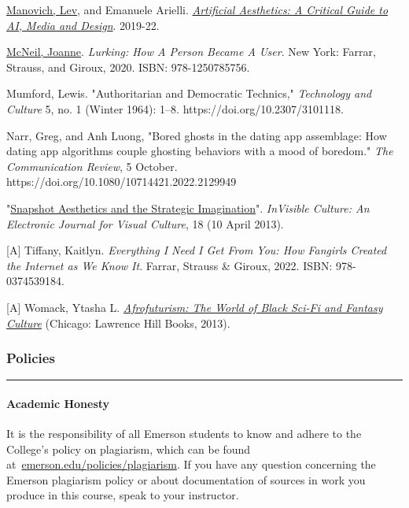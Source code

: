\documentclass[
  letterpaper,
  DIV=11,
  numbers=noendperiod]{scrartcl}
\let\oldparagraph\paragraph
\renewcommand{\paragraph}[1]{\oldparagraph{#1}\mbox{}}
\begin{document}
\href{https://manovich.net/}{Manovich, Lev}, and Emanuele Arielli.
\href{http://manovich.net/index.php/projects/artificial-aesthetics-book}{\emph{Artificial
Aesthetics: A Critical Guide to AI, Media and Design}}. 2019-22.

\href{https://joannemcneil.com/}{McNeil, Joanne}. \emph{Lurking: How A
Person Became A User}. New York: Farrar, Strauss, and Giroux, 2020.
ISBN: 978-1250785756.

Mumford, Lewis. "Authoritarian and Democratic Technics,"
\emph{Technology and Culture} 5, no. 1 (Winter 1964): 1--8.
https://doi.org/10.2307/3101118.

Narr, Greg, and Anh Luong, "Bored ghosts in the dating app assemblage:
How dating app algorithms couple ghosting behaviors with a mood of
boredom." \emph{The Communication Review}, 5 October.
https://doi.org/10.1080/10714421.2022.2129949

"\href{http://ivc.lib.rochester.edu/snapshot-aesthetics-and-the-strategic-imagination/}{Snapshot
Aesthetics and the Strategic Imagination}". \emph{InVisible Culture: An
Electronic Journal for Visual Culture}, 18 (10 April 2013).

{[}A{]} Tiffany, Kaitlyn. \emph{Everything I Need I Get From You: How
Fangirls Created the Internet as We Know It}. Farrar, Strauss \& Giroux,
2022. ISBN: 978-0374539184.

{[}A{]} Womack, Ytasha L.
\href{https://ebookcentral.proquest.com/lib/emerson/reader.action?docID=1381831\&ppg=1}{\emph{Afrofuturism:
The World of Black Sci-Fi and Fantasy Culture}} (Chicago: Lawrence Hill
Books, 2013).

\hypertarget{policies}{%
\subsubsection{Policies}\label{policies}}

\begin{center}\rule{0.5\linewidth}{0.5pt}\end{center}

\hypertarget{academic-honesty}{%
\paragraph{Academic Honesty}\label{academic-honesty}}

It is the responsibility of all Emerson students to know and adhere to
the College's policy on plagiarism, which can be found
at~\href{https://emerson.edu/policies/plagiarism}{emerson.edu/policies/plagiarism}.
If you have any question concerning the Emerson plagiarism policy or
about documentation of sources in work you produce in this course, speak
to your instructor.
\end{document}
